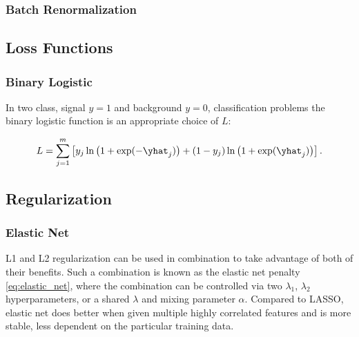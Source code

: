 \subsubsection{Batch Renormalization}
\label{additional:ml:general:reg:batch_renorm}

\subsection{Loss Functions}
\label{additional:ml:general:loss_func}


\subsubsection{Binary Logistic}
\label{additional:ml:sgeneral:loss_functions:binary_logistic}

In two class, signal $y=1$ and background $y=0$, classification problems the binary logistic function is an appropriate choice of $L$:

\begin{equation} \label{eq:binary_logistic}
L = \sum_{j=1}^{m} \left[y_{j} \ln\left(1 + \exp(-\yhat_{j})\right) +\left(1-y_{j}\right) \ln\left(1 + \exp(\yhat_{j})\right)\right].
\end{equation}


\subsection{Regularization}
\label{additional:ml:general:reg}

\subsubsection{Elastic Net}
\label{additional:ml:general:reg:EN}

L1 and L2 regularization can be used in combination
to take advantage of both of their benefits.
Such a combination is known as the elastic net penalty \cref{eq:elastic_net},
where the combination can be controlled via two $\lambda_{1}$, $\lambda_{2}$ hyperparameters,
or a shared $\lambda$ and mixing parameter $\alpha$.
Compared to LASSO, elastic net does better when given multiple highly correlated features
and is more stable, \ie less dependent on the particular training data.

